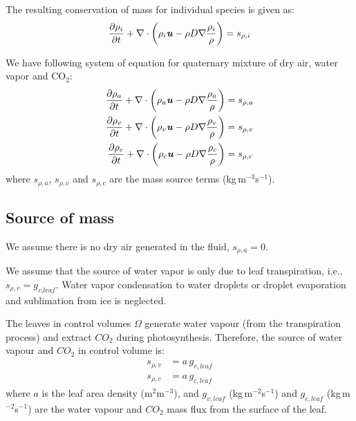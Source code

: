 The resulting conservation of mass for individual species is given as:
\begin{equation}
\frac{{\partial {\rho _i}}}{{\partial t}} + \nabla  \cdot \left( {{\rho _i}{\textbf{\textit{u}}} - {\rho}{D}\nabla \frac{{{\rho _i}}}{{{\rho}}}} \right) = {s_{\rho ,i}}
\end{equation}

We have following system of equation for quaternary mixture of dry air, water vapor and CO$_2$:
\begin{align}
\frac{{\partial {\rho _a}}}{{\partial t}} + \nabla  \cdot \left( {{\rho _a}{\textbf{\textit{u}}} - {\rho }{D}\nabla \frac{{{\rho _a}}}{{{\rho }}}} \right) &= {s_{\rho ,a}} \label{eq:comaa}\\
\frac{{\partial {\rho _v}}}{{\partial t}} + \nabla  \cdot \left( {{\rho _v}{\textbf{\textit{u}}} - {\rho }{D}\nabla \frac{{{\rho _v}}}{{{\rho }}}} \right) &= {s_{\rho ,v}} \label{eq:comvv}\\
\frac{{\partial {\rho _{c}}}}{{\partial t}} + \nabla  \cdot \left( {{\rho _{c}}{\textbf{\textit{u}}} - {\rho }{D}\nabla \frac{{{\rho _{c}}}}{{{\rho }}}} \right) &= {s_{\rho ,{c}}}
\end{align}
where ${s_{\rho ,a}}$, ${s_{\rho ,v}}$ and ${s_{\rho ,c}}$ are the mass source terms (kg\,m$^{-3}$s$^{-1}$).

\subsection{Source of mass}

\begin{assumption}
	We assume there is no dry air generated in the fluid, ${s_{\rho ,a}} = 0$. 
\end{assumption}

\begin{assumption}
	We assume that the source of water vapor is only due to leaf transpiration, i.e., $s_{\rho,v} = g_{\textit{v,leaf}}$. Water vapor condensation to water droplets or droplet evaporation and sublimation from ice is neglected.
\end{assumption}

The leaves in control volumes $\Omega$ generate water vapour (from the transpiration process) and extract $CO_2$ during photosynthesis. Therefore, the source of water vapour and $CO_2$ in control volume is:
\begin{align}
{s_{\rho ,v}} &= a\, g_{v,leaf} \label{eq:gvsource}\\
{s_{\rho ,c}} &= a\, g_{c,leaf}
\end{align}
where $a$ is the leaf area density (m$^2$m$^{-3}$), and $g_{v,\mathit{leaf}}$ (kg\,m$^{-2}$s$^{-1}$) and $g_{c,\mathit{leaf}}$ (kg\,m$^{-2}$s$^{-1}$) are the water vapour and $CO_2$ mass flux from the surface of the leaf.

